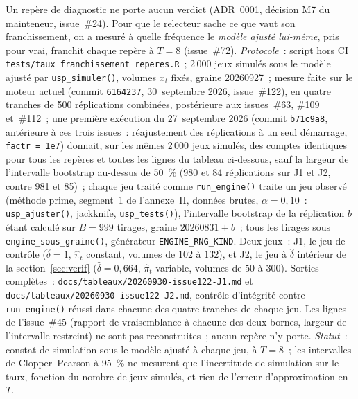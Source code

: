 \documentclass[a4paper,11pt]{article}
\newcommand{\code}[1]{\texttt{\small #1}}
\begin{document}
Un repère de diagnostic ne porte aucun verdict (ADR~0001, décision M7 du mainteneur, issue~\#24).
Pour que le relecteur sache ce que vaut son franchissement, on a mesuré à quelle fréquence le
\emph{modèle ajusté lui-même}, pris pour vrai, franchit chaque repère à $T = 8$ (issue~\#72).
\emph{Protocole}~: script hors CI \code{tests/taux\_franchissement\_reperes.R}~; 2\,000 jeux simulés
sous le modèle ajusté par \code{usp\_simuler()}, volumes $x_t$ fixés, graine 20260927~; mesure
faite sur le moteur actuel (commit \code{6164237}, 30~septembre 2026, issue~\#122), en quatre
tranches de 500 réplications combinées, postérieure aux issues~\#63, \#109 et~\#112~; une
première exécution du 27~septembre 2026 (commit \code{b71c9a8}, antérieure à ces trois issues~:
réajustement des réplications à un seul démarrage, \code{factr = 1e7}) donnait, sur les mêmes
2\,000 jeux simulés, des comptes identiques pour tous les repères et toutes les lignes du tableau
ci-dessous, sauf la largeur de l'intervalle bootstrap au-dessus de 50~\% (980 et 84 réplications
sur J1 et J2, contre 981 et 85)~; chaque jeu
traité comme \code{run\_engine()} traite un jeu observé (méthode prime, segment~1 de l'annexe~II,
données brutes, $\alpha = 0{,}10$~: \code{usp\_ajuster()}, jackknife, \code{usp\_tests()}), l'intervalle
bootstrap de la réplication $b$ étant calculé sur $B = 999$ tirages, graine $20260831 + b$~; tous
les tirages sous \code{engine\_sous\_graine()}, générateur \code{ENGINE\_RNG\_KIND}. Deux jeux~: J1,
le jeu de contrôle ($\hat\delta = 1$, $\hat\pi_t$ constant, volumes de $102$ à $132$), et J2, le jeu
à $\hat\delta$ intérieur de la section~\ref{sec:verif} ($\hat\delta = 0{,}664$, $\hat\pi_t$ variable,
volumes de $50$ à $300$). Sorties complètes~: \code{docs/tableaux/20260930-issue122-J1.md} et
\code{docs/tableaux/20260930-issue122-J2.md}, contrôle d'intégrité contre \code{run\_engine()} réussi
dans chacune des quatre tranches de chaque jeu. Les lignes de l'issue~\#45 (rapport de vraisemblance à chacune des deux bornes, largeur de
l'intervalle restreint) ne sont pas reconstruites~; aucun repère n'y porte. \emph{Statut}~: constat de simulation sous le modèle ajusté à chaque jeu, à $T = 8$~;
les intervalles de Clopper--Pearson à 95~\% ne mesurent que l'incertitude de simulation sur le
taux, fonction du nombre de jeux simulés, et rien de l'erreur d'approximation en $T$.
\end{document}
